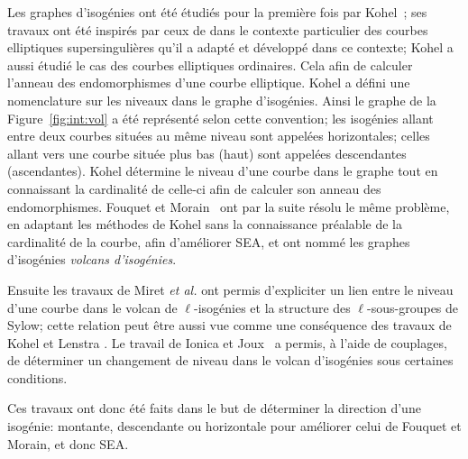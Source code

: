 \documentclass[10pt,a4paper]{book}
\theoremstyle{plain}
\theoremstyle{definition}
\theoremstyle{definition}
\theoremstyle{definition}
\theoremstyle{definition}
\theoremstyle{definition}
\theoremstyle{remark}
\theoremstyle{remark}
\theoremstyle{definition}
\begin{document}
Les graphes d'isogénies ont été étudiés pour la première fois par 
Kohel~\cite{Kohel96}; ses travaux ont été inspirés par ceux de
\cite{Mestre86,Pizer90,Pizer95} dans le contexte particulier des 
courbes elliptiques supersingulières 
qu'il a adapté et développé dans ce contexte; Kohel a aussi étudié le cas des 
courbes elliptiques ordinaires. Cela afin de calculer l'anneau des 
endomorphismes d'une courbe 
elliptique. Kohel a défini une nomenclature sur les niveaux dans le graphe 
d'isogénies. Ainsi le graphe de la Figure~\ref{fig:int:vol} a été représenté
selon cette convention; les isogénies allant entre deux courbes situées au même
niveau sont appelées horizontales; celles allant vers une courbe située plus 
bas (haut) sont appelées descendantes (ascendantes). %
Kohel détermine le niveau d'une courbe dans le graphe tout en 
connaissant la cardinalité de celle-ci afin de calculer son anneau des 
endomorphismes. Fouquet et Morain~\cite{FouquetMorain02} ont par la suite résolu le même 
problème, en adaptant les méthodes de Kohel sans la connaissance préalable de 
la cardinalité de la courbe, afin d'améliorer SEA, et ont nommé les graphes 
d'isogénies \emph{volcans d'isogénies}. 

Ensuite les travaux de Miret \textit{et al.} 
\cite{MiretMRV05}  \cite{MiretMSTV06} 
\cite{MiretMSTV08} ont permis d'expliciter un lien entre le niveau d'une courbe
dans le volcan de $\ell$-isogénies et la structure des $\ell$-sous-groupes de 
Sylow; cette relation peut être aussi vue comme une conséquence des travaux de 
Kohel \cite{Kohel96} et Lenstra \cite{Lenstra96}. 
Le travail de Ionica et Joux~\cite{Ionica-Joux10} a permis, à l'aide de 
couplages, de déterminer un changement de niveau dans le volcan d'isogénies 
sous certaines conditions.


Ces travaux ont donc été faits dans le but de 
déterminer la direction d'une isogénie: montante, descendante ou horizontale pour 
améliorer celui de Fouquet et Morain, et donc SEA.
\end{document}
